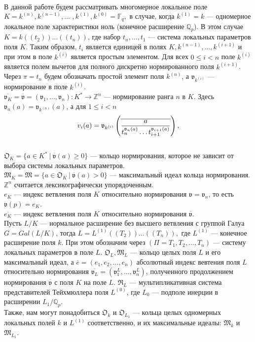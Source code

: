 \documentclass[a4paper]{article}
\newcommand{\Qp}{\mathbb{Q}_p}
\newcommand{\Fq}{\mathbb{F}_q}
\newcommand{\Z}{\mathbb{Z}}
\newcommand{\ML}{\mathfrak{M}_L}
\newcommand{\MLO}{\mathfrak{M}_{L_1}}
\newcommand{\MK}{\mathfrak{M}_K}
\newcommand{\Mk}{\mathfrak{M}_k}
\newcommand{\Ok}{\mathfrak{O}_k}
\newcommand{\OK}{\mathfrak{O}_K}
\newcommand{\OL}{\mathfrak{O}_L}
\newcommand{\OLO}{\mathfrak{O}_{L_1}}
\newcommand{\RL}{\mathfrak{R}_L}
\newcommand{\val}{\mathfrak{v}}
\newcommand{\olval}{\overline{\mathfrak{v}}}
\newcommand{\Leq}{\leqslant}
\newcommand{\Geq}{\geqslant}
\begin{document}
\paragraph{}
В данной работе будем рассматривать многомерное локальное поле $K=k^{(n)}, k^{(n-1)},\dots$ $,k^{(1)},k^{(0)}=\Fq,$ в случае, когда $k^{(1)} = k$ --- одномерное локальное поле характеристики ноль (конечное расширение $\Qp$). В этом случае $K = k((t_2))\dots((t_n))$, где набор $t_n,\dots,t_1$ --- система локальных параметров поля $K$. Таким образом, $t_i$ является единицей в полях $K,k^{(n-1)},\dots,k^{(i+1)}$ и при этом в поле $k^{(i)}$ является простым элементом. Для всех $0 \leq i < n$ поле $k^{(i)}$ является полем вычетов для полного дискретно нормированного поля $k^{(i+1)}$. Через $\pi = t_n$ будем обозначать простой элемент поля $k^{(n)}$, а $\val_{k^{(i)}}$ --- нормирование в поле $k^{(i)}$.\\
$\overline{\val_K}=\olval=(\val_1,\dots,\val_n):K^*\rightarrow\Z^n$ --- нормирование ранга $n$ в $K$. Здесь $\val_n(a)=\val_{k^{(n)}}(a)$, а для $1\Leq i<n$
$$v_i(a) = \val_{k^{(i)}} \left( \overline {a \over { t_n^{\val_n(a)} \ldots t_{i+1}^{\val_{i+1}(a)} } } \right),$$\\
$\OK=\{a\in K^*\ |\ \overline{\val}(a)\Geq0\}$ --- кольцо нормирования, которое не зависит от выбора системы локальных параметров.\\
$\MK=\mathfrak{M}=\{a\in\OK\ |\ \overline{\val}(a)>0\}$ --- максимальный идеал кольца нормирования. $\Z^n$ считается лексикографически упорядоченным.\\
$e_K$ --- индекс ветвления поля $K$ относительно нормирования $\val=\val_n$, то есть $\val(p)=e_K$.\\
$\overline{e_K}$ --- индекс ветвления поля $K$ относительно нормирования $\olval$.\\

Пусть $L/K$ --- нормальное расширение без высшего ветвления с группой Галуа $G=Gal(L/K)$, тогда $L = L^{(1)}((T_2))\dots((T_n)),$ где $L^{(1)}$ --- конечное расширение поля $k$. При этом обозначим через $(\Pi = T_1, T_2, \dots, T_n)$ --- систему локальных параметров в поле $L$.
$\OL,\ML$ --- кольцо целых поля $L$ и его максимальный идеал, а $\overline{e}=(e_1, e_2, \ldots, e_n)$ абсолютный индекс вевтения поля $L$ относительно нормирования $\overline{\val_L} = (\val_1^L, \ldots, \val_n^L)$, полученного продолжением нормирования $\olval$ с поля $K$ на поле $L$. $\RL$ --- мультипликативная система представителей Тейхмюллера поля $L^{(0)}$, где $L_0$ --- подполе инерции в расширении $L_1/\Qp$.\\
Также, нам могут понадобиться $\Ok$ и $\OLO$ --- кольца целых одномерных локальных полей $k$ и $L^{(1)}$ соответственно, и их максимальные идеалы: $\Mk$ и $\MLO$.
\end{document}
